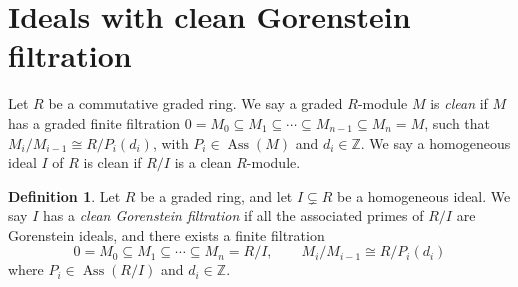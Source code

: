 \documentclass[11pt,letterpaper]{amsart}
\newcommand{\seq}{\subseteq}
\newcommand{\x}{\xrightarrow{}}
\DeclareMathOperator{\Ass}{Ass}
\DeclareMathOperator{\rank}{rank}
\theoremstyle{plain}
\newtheorem{lem}[thm]{Lemma}
\newtheorem{cor}[thm]{Corollary}
\theoremstyle{definition}
\newtheorem{defi}[thm]{Definition}
\theoremstyle{remark}
\begin{document}

\section{Ideals with clean Gorenstein filtration}

Let $R$ be a commutative graded ring. We say a graded $R$-module $M$ is \emph{clean} if $M$ has a graded finite filtration $0=M_0\seq M_1\seq\cdots \seq M_{n-1}\seq M_n=M$, such that $M_i/M_{i-1}\cong R/P_i(d_i)$, with $P_i\in\Ass(M)$ and $d_i\in\mathbb Z$. We say a homogeneous ideal $I$ of $R$ is clean if $R/I$ is a clean $R$-module. 

\begin{defi}\label{deficleangorenstein}
    Let $R$ be a graded ring, and let $I\subsetneq R$ be a homogeneous ideal. We say $I$ has a \emph{clean Gorenstein filtration} if all the associated primes of $R/I$ are Gorenstein ideals, and there exists a finite filtration $$0=M_0\seq M_1\seq\cdots\seq M_n=R/I,\qquad M_{i}/M_{i-1}\cong R/P_i(d_i)$$ where $P_i\in\Ass(R/I)$ and $d_i\in\mathbb Z$.
\end{defi}
\end{document}
